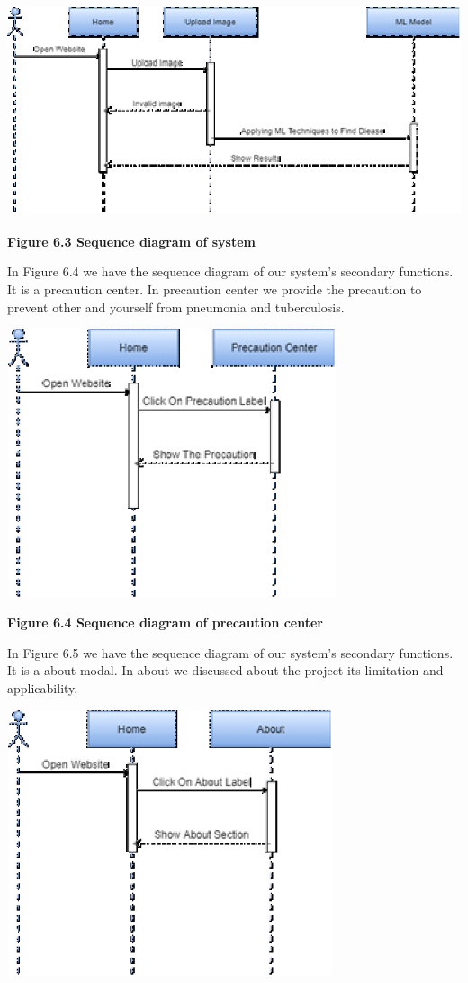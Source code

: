\documentclass{article} %
\begin{document}
\noindent \includegraphics*[width=5.85in, height=2.45in, keepaspectratio=false]{image30}

\noindent \textbf{Figure 6.3 Sequence diagram of system}

\noindent In Figure 6.4 we have the sequence diagram of our system's secondary functions. It is a precaution center. In precaution center we provide the precaution to prevent other and yourself from pneumonia and tuberculosis. 

\noindent \includegraphics*[width=3.81in, height=3.11in, keepaspectratio=false]{image31}

\noindent \textbf{Figure 6.4 Sequence diagram of precaution center}

\noindent In Figure 6.5 we have the sequence diagram of our system's secondary functions. It is a about modal. In about we discussed about the project its limitation and applicability.

\noindent \includegraphics*[width=3.77in, height=3.08in, keepaspectratio=false]{image32}
\end{document}
